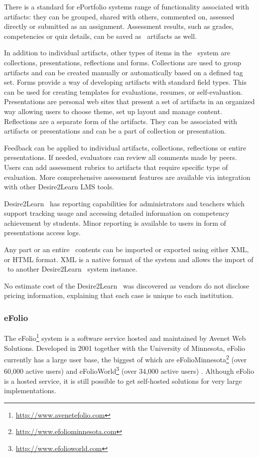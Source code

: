 There is a standard for ePortfolio systems range of functionality associated
with artifacts: they can be grouped, shared with others, commented on, assessed
directly or submitted as an assignment. Assessment results, such as grades,
competencies or quiz details, can be saved as \ep~artifacts as well.

In addition to individual artifacts, other types of items in the \ep~system are
collections, presentations, reflections and forms. Collections are used to group
artifacts and can be created manually or automatically based on a defined tag
set. Forms provide a way of developing artifacts with standard field types. This
can be used for creating templates for evaluations, resumes, or self-evaluation.
Presentations are personal web sites that present a set of artifacts in an
organized way allowing users to choose theme, set up layout and manage content.
Reflections are a separate form of the artifacts. They can be associated with
artifacts or presentations and can be a part of collection or presentation.

Feedback can be applied to individual artifacts, collections, reflections or
entire presentations. If needed, evaluators can review all comments made by
peers. Users can add assessment rubrics to artifacts that require specific
type of evaluation. More comprehensive assessment features are available via
integration with other Desire2Learn LMS tools. 

Desire2Learn \ep~has reporting capabilities for administrators and teachers
which support tracking usage and accessing detailed information on competency
achievement by students. Minor reporting is available to users in form of
presentations access logs.

Any part or an entire \ep~contents can be imported or exported using either XML,
or HTML format. XML is a native format of the system and allows the import of
\ep~to another Desire2Learn \ep~system instance.

No estimate cost of the Desire2Learn \ep~was discovered as vendors do not
disclose pricing information, explaining that each case is unique to each
institution.
 
\subsubsection{eFolio}

The eFolio\footnote{\url{http://www.avenetefolio.com}} system is a software
service hosted and maintained by Avenet Web Solutions. Developed in 2001
together with the University of Minnesota, eFolio currently has a large user
base, the biggest of which are
eFolioMinnesota\footnote{\url{http://www.efoliominnesota.com}} (over 60,000
active users) and eFolioWorld\footnote{\url{http://www.efolioworld.com}} (over
34,000 active users) \citep{AAEEBL2011}. Although eFolio is a hosted service, it
is still possible to get self-hosted solutions for very large implementations.

